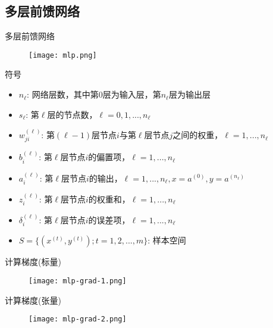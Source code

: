 \subsection{多层前馈网络}

\begin{frame}[fragile]{多层前馈网络}
  \begin{figure}
    \centering
    \texttt{[image: mlp.png]}
  \end{figure}
\end{frame}

\begin{frame}{符号}
 \begin{itemize}
   \item \alert{$ {n_{\ell}} $}: 网络层数，其中第$0$层为输入层，第$n_{\ell}$层为输出层
   \item \alert{$ {s_{\ell}} $}: 第$\ell$层的节点数，$ \ell = 0, 1, ..., n_{\ell} $
   \item \alert{$ w_{ji}^{(\ell)} $}: 第$(\ell-1)$层节点$i$与第$\ell$层节点$j$之间的权重，$ \ell = 1, ..., n_{\ell} $
   \item \alert{$ b_i^{(\ell)} $}: 第$\ell$层节点$i$的偏置项，$ \ell = 1, ..., n_{\ell} $
   \item \alert{$ a_i^{(\ell)} $}: 第$\ell$层节点$i$的输出，$ \ell = 1, ..., n_{\ell}, x = a^{(0)}, y = a^{(n_{\ell})} $
   \item \alert{$ z_i^{(\ell)} $}: 第$\ell$层节点$i$的权重和，$ \ell = 1, ..., n_{\ell} $
   \item \alert{$ \delta _i^{(\ell)} $}: 第$\ell$层节点$i$的误差项，$ \ell = 1, ..., n_{\ell} $
   \item \alert{$ S = \{ ({x^{(t)}},{y^{(t)}});t = 1,2,...,m\} $}: 样本空间
 \end{itemize}
\end{frame}

\begin{frame}{计算梯度(标量)}
  \begin{figure}
    \centering
    \texttt{[image: mlp-grad-1.png]}
  \end{figure}
\end{frame}

\begin{frame}{计算梯度(张量)}
  \begin{figure}
    \centering
    \texttt{[image: mlp-grad-2.png]}
  \end{figure}
\end{frame}

